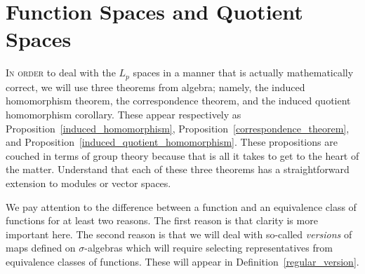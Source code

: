\documentclass[
twoside=true,
paper=letter,
fontsize=9pt,
pagesize=auto,
leqno,
openany,
headsepline,
overfullrule,
]{scrbook}
\theoremstyle{plain}
\theoremstyle{plain}
\theoremstyle{definition}
\theoremstyle{bfnoteitalic}
\theoremstyle{bfnoteroman}
\newcommand{\textsigma}{\hbox{\large{$\sigma$}}\kern-1pt}
\begin{document}
\chapter{Function Spaces and Quotient Spaces}
\lettrine{I}{n order} to deal with the $L_p$ spaces in a manner that is actually mathematically correct, 
we will use three theorems from algebra; namely, 
the induced homomorphism theorem, the correspondence theorem, and the induced quotient homomorphism corollary. These appear respectively as Proposition~\ref{induced_homomorphism}, Proposition~\ref{correspondence_theorem}, and Proposition~\ref{induced_quotient_homomorphism}. These propositions are couched in terms of group theory because that is all it takes to get to the heart of the matter. Understand that each of these three theorems has a straightforward extension to modules or vector spaces.

We pay attention to the difference between a function and an equivalence class of functions for at least two reasons.  The first reason is that  clarity is more important here.  The second reason is that we will deal with so-called \emph{versions} of maps defined on \textsigma-algebras which will require selecting representatives from equivalence classes of functions. These will appear in Definition~\ref{regular_version}.
\end{document}

